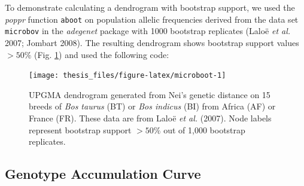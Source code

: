 \documentclass[double,12pt]{beavtex}
\begin{document}
  To demonstrate calculating a dendrogram with bootstrap support, we used
  the \emph{poppr} function \texttt{aboot} on population allelic
  frequencies derived from the data set \texttt{microbov} in the
  \emph{adegenet} package with 1000 bootstrap replicates (Laloë \emph{et
  al.} 2007; Jombart 2008). The resulting dendrogram shows bootstrap
  support values \(>50\%\) (Fig. \ref{fig:microboot}) and used the
  following code:
  
  \begin{Shaded}
  \begin{Highlighting}[]
  \NormalTok{(}\NormalTok{);}
  \NormalTok{(}\NormalTok{, } \NormalTok{);}
  \StringTok{ }\NormalTok{(}
  \StringTok{ }\ErrorTok{~}
  \StringTok{ }
  
  \NormalTok{(}\NormalTok{);}
  \StringTok{ } \NormalTok{, } \NormalTok{);}
  \end{Highlighting}
  \end{Shaded}
  
  \begin{figure}
  
  {\centering \texttt{[image: thesis\_files/figure-latex/microboot-1]} 
  
  }
  
  \caption[UPGMA dendrogram generated from Nei's genetic distance]{UPGMA dendrogram generated from Nei's genetic distance on 15 breeds of
  \emph{Bos taurus} (BT) or \emph{Bos indicus} (BI) from Africa (AF) or
  France (FR). These data are from Laloë \emph{et al.} (2007). Node labels
  represent bootstrap support \(>50\%\) out of 1,000 bootstrap replicates.}\label{fig:microboot}
  \end{figure}
  
  \subsection{Genotype Accumulation
  Curve}\label{genotype-accumulation-curve}
  
\end{document}

